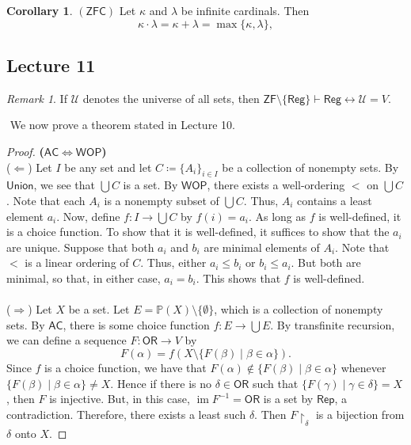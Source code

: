\documentclass[10pt,letterpaper,cm]{nupset}
\theoremstyle{definition}
\theoremstyle{theorem}
\newtheorem{corollary}[definition]{Corollary}
\theoremstyle{remark}
\newtheorem{remark}[definition]{Remark}
\newcommand{\U}{\mathcal U}
\renewcommand{\P}{\mathbb P}
\newcommand{\1}{\mathbf{1}}
\newcommand{\0}{\vec 0}
\newcommand{\zf}{\mathsf{ZF}}
\newcommand{\zfc}{\mathsf{ZFC}}
\newcommand{\ac}{\mathsf{AC}}
\newcommand{\ord}{\mathsf{OR}}
\DeclareMathOperator{\im}{im}
\begin{document}
\begin{corollary}{$(\zfc)$}
Let $\kappa$ and $\lambda$ be infinite cardinals.
Then $$\kappa \cdot \lambda = \kappa + \lambda = \max\{\kappa, \lambda\},$$
\end{corollary}

\subsection{Lecture 11}

\begin{remark}
If $\U$ denotes the universe of all sets, then $\zf \setminus \{\mathsf{Reg}\} \vdash \mathsf{Reg} \leftrightarrow \U = V$.
\end{remark}$ $
We now prove a theorem stated in Lecture 10.

\begin{proof}{\textbf{($\ac \iff \mathsf{WOP}$)}}$ $\\ 
($\Longleftarrow$) Let $I$ be any set and let $C\coloneqq \{A_i\}_{i\in I}$ be a collection of nonempty sets. By  $\mathsf{Union}$, we see that $\bigcup C$ is a set. By $\mathsf{WOP}$, there exists a well-ordering $<$ on $\bigcup C$. Note that each $A_i$ is a nonempty subset of $\bigcup C$. Thus, $A_i$ contains a least element $a_i$. Now, define $f: I \rightarrow \bigcup C$ by $f(i)=a_i$. As long as $f$ is well-defined, it is a choice function. To show that it is well-defined, it suffices to show that the $a_i$ are unique. Suppose that both $a_i$ and $b_i$ are minimal elements of $A_i$. Note  that $<$ is a linear ordering of $C$. Thus, either $a_i \leq b_i$ or $b_i\leq a_i$. But both are minimal, so that, in either case, $a_i=b_i$. This shows that $f$ is well-defined.
\\ \\
($\Longrightarrow$) Let $X$ be a set. Let $E = \P(X) \setminus \{\emptyset\}$, which is a collection of nonempty sets. By $\ac$, there is some choice function $f : E \to \bigcup{E}$.  By transfinite recursion, we can define a sequence $F : \ord \to V$ by 
$$ F(\alpha) = f(X \setminus \{F(\beta) \mid \beta \in \alpha \})   .$$ Since $f$ is a choice function, we have that $F(\alpha) \notin \{F(\beta) \mid \beta \in \alpha\}$ whenever $\{F(\beta) \mid \beta \in \alpha\} \ne X$. Hence if there is no $\delta \in \ord$ such that $\{F(\gamma) \mid \gamma \in \delta\} =X$, then $F$ is injective. But, in this case, $\im{F^{-1}} = \ord$ is a set by $\mathsf{Rep}$, a contradiction. Therefore, there exists a least such $\delta$. Then $F\restriction_{\delta}$ is a bijection from $\delta$ onto $X$.
\end{proof}
\end{document}
